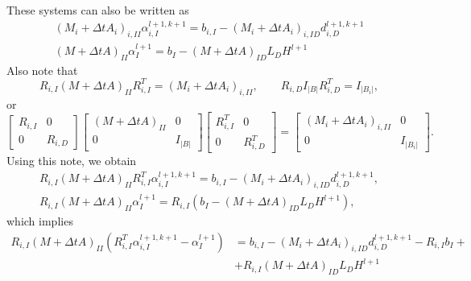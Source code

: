 \documentclass[a4paper, 11pt]{article}
\theoremstyle{plain}
\theoremstyle{definition}
\theoremstyle{remark}
\begin{document}
These systems can also be written as
\begin{align*}
    \left(M_{i} + \Delta t A_{i}\right)_{i, II}\alpha_{i, I}^{l+1, k+1} = b_{i, I} - \left(M_{i} + \Delta t A_{i}\right)_{i, ID}d^{l+1, k+1}_{i, D}\\
    \left(M + \Delta t A\right)_{II}\alpha_{I}^{l+1} = b_{I} - \left(M + \Delta t A\right)_{ID}L_{D}H^{l+1}
\end{align*}
Also note that
\begin{equation*}
    R_{i, I}\left(M + \Delta t A\right)_{II}R_{i, I}^{T} = \left(M_{i} + \Delta t A_{i}\right)_{i, II},\qquad R_{i, D}I_{\lvert B\rvert}R_{i, D}^{T} = I_{\lvert B_{i}\rvert},
\end{equation*}
or
\begin{equation*}
    \begin{bmatrix}
        R_{i, I} & 0\\
        0& R_{i, D}
    \end{bmatrix}
    \begin{bmatrix}
        \left(M + \Delta t A\right)_{II} & 0\\
        0 & I_{\lvert B\rvert}
    \end{bmatrix}
    \begin{bmatrix}
        R_{i, I}^{T} & 0\\
        0& R_{i, D}^{T}
    \end{bmatrix}
    =
    \begin{bmatrix}
        \left(M_{i} + \Delta t A_{i}\right)_{i, II} & 0\\
        0 & I_{\lvert B_{i}\rvert}
    \end{bmatrix}.
\end{equation*}
Using this note, we obtain
\begin{align*}
    R_{i, I}\left(M + \Delta t A\right)_{II}R_{i, I}^{T}\alpha_{i, I}^{l+1, k+1} = b_{i, I} - \left(M_{i} + \Delta t A_{i}\right)_{i, ID}d^{l+1, k+1}_{i, D},\\
    R_{i, I}\left(M + \Delta t A\right)_{II}\alpha_{I}^{l+1} = R_{i, I}\left(b_{I} - \left(M + \Delta t A\right)_{ID}L_{D}H^{l+1}\right),
\end{align*}
which implies
\begin{align*}
    R_{i, I}\left(M + \Delta t A\right)_{II}\left(R_{i, I}^{T}\alpha_{i, I}^{l+1, k+1} - \alpha_{I}^{l+1}\right) &= b_{i, I} - \left(M_{i} + \Delta t A_{i}\right)_{i, ID}d^{l+1, k+1}_{i, D} - R_{i, I}b_{I} +\\
    &+ R_{i, I}\left(M + \Delta t A\right)_{ID}L_{D}H^{l+1}
\end{align*}
\end{document}
